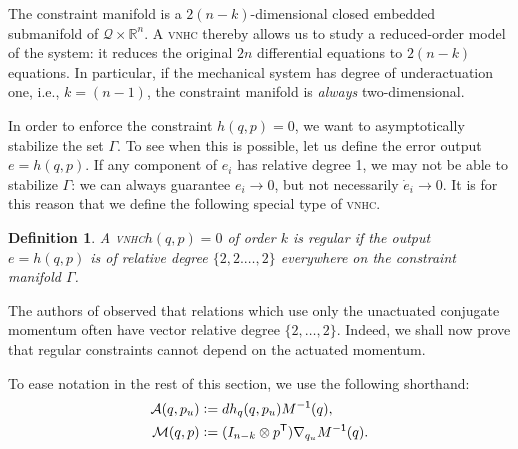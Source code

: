\documentclass[journal,twoside,web, twocolumn,draftcls]{ieeecolor}
\newtheorem{defn}{Definition} %
\newcommand*{\tpose}{^\mathsf{T}}
\newcommand*{\R}{\mathbb{R}}
\newcommand*{\Minv}{M^\mathsf{-1}}
\newcommand*{\Id}[1]{I_{#1}}
\newcommand*{\eqdef}{\vcentcolon=}
\newcommand*{\vnhc}{\textsc{vnhc}\xspace}
\begin{document}
The constraint manifold is a \(2(n-k)\)-dimensional closed embedded submanifold
of \(\mathcal{Q} \times \R^n\). A \vnhc thereby allows us to study a
reduced-order model of the system: it reduces the original \(2n\) differential
equations to \(2(n-k)\) equations. In particular, if the mechanical system has
degree of underactuation one, i.e., \(k = (n-1)\), the constraint manifold is
\textit{always} two-dimensional.

In order to enforce the constraint \(h(q,p) = 0\), we want to asymptotically
stabilize the set \(\Gamma\). To see when this is possible, let us define the
error output \(e = h(q,p)\). If any component of \(e_i\) has relative degree 1,
we may not be able to stabilize \(\Gamma\): we can always guarantee 
\(e_i \to 0\), but not necessarily \(\dot{e}_i \to 0\). It is for this reason
that we define the following special type of \vnhc.

\begin{defn}
    A \vnhc \(h(q,p) = 0\) of order \(k\) is \textit{regular} if the output 
    \(e = h(q,p)\) is of relative degree \(\{2,2.\ldots,2\}\) everywhere on the
    constraint manifold \(\Gamma\).
\end{defn}

The authors of
\cite{nhvc_dynamic_walking,hybrid_zero_dynamics_bipedal_nhvcs}
observed that relations which use only the unactuated conjugate momentum
often have vector relative degree \(\{2,\ldots,2\}\).
Indeed, we shall now prove that regular constraints cannot depend on the
actuated momentum.

To ease notation in the rest of this section, we use the following shorthand:
\begin{align}
    \mathcal{A}(q,p_u) &\eqdef dh_q(q,p_u) \Minv(q) 
        ,\\
    \mathcal{M}(q,p) &\eqdef (\Id{n-k} \otimes p\tpose)\nabla_{q_u}\Minv(q) 
    .
\end{align}
\end{document}
